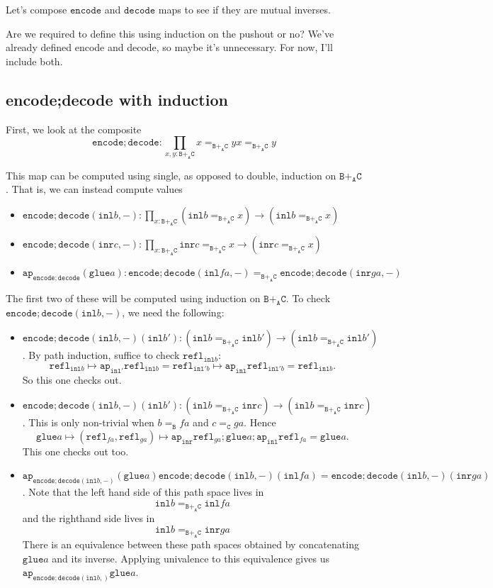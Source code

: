 \documentclass[12pt]{amsart}
\newcommand{\from}{\colon}
\newcommand{\edit}[1]{{\color{red} #1 }}
\newcommand{\type}[1]{\mathtt{#1}}
\newcommand{\tin}{\colon}
\newcommand{\A}{\type{A}}
\newcommand{\B}{\type{B}}
\newcommand{\C}{\type{C}}
\newcommand{\BAC}{\B +_{\A} \C}
\newcommand{\ap}{\type{ap}}
\newcommand{\inl}{\type{inl}}
\newcommand{\inr}{\type{inr}}
\newcommand{\glue}{\type{glue}}
\newcommand{\refl}{\type{refl}}
\newcommand{\encode}{\type{encode}}
\newcommand{\decode}{\type{decode}}
\theoremstyle{remark}
\theoremstyle{definition}
\begin{document}
Let's compose \( \encode \) and \( \decode \) maps to see if they are
mutual inverses.  

\edit{ Are we required to define this using induction on the pushout
  or no? We've already defined encode and decode, so maybe it's
  unnecessary. For now, I'll include both.}

\subsection{encode;decode with induction}

First, we look at the composite
\[
  \encode ; \decode
  \from
  \prod\limits_{x,y \tin \BAC} x =_{\BAC} y
  x =_{\BAC} y
\]

This map can be computed using single, as opposed to double, induction
on \( \BAC \). That is, we can instead compute values
\begin{itemize}
\item
  \( \encode ; \decode ( \inl b , - ) \from \prod\limits_{x \tin
  \BAC} ( \inl b =_{\BAC} x ) \to ( \inl b =_{\BAC} x ) \)
\item
  \( \encode ; \decode ( \inr c , - ) \from \prod\limits_{x \tin
  \BAC} \inr c =_{\BAC} x \to ( \inr c =_{\BAC} x ) \)
\item
  \( \ap_{\encode ; \decode} (\glue a ) \tin \encode ; \decode ( \inl
  fa , -  )
  =_{\BAC} \encode ; \decode (\inr ga , - ) \)
\end{itemize}

The first two of these will be computed using induction on \( \BAC
\). To check \( \encode ; \decode ( \inl b , - ) \), we need the
following:
\begin{itemize}
\item
  \( \encode ; \decode ( \inl b , - ) ( \inl b' ) \from ( \inl b
  =_{\BAC} \inl b' ) \to ( \inl b =_{\BAC} \inl b' )  \). By path
  induction, suffice to check \( \refl_{\inl b} \):
  \[
    \refl_{\inl b} \mapsto \ap_{\inl'} \refl_{\inl b}
    = \refl_{\inl' b} \mapsto \ap_{\inl} \refl_{\inl' b} =
    \refl_{\inl b}.
  \]
  So this one checks out.
\item
  \( \encode ; \decode ( \inl b , - ) ( \inl b' ) \from ( \inl b
  =_{\BAC} \inr c ) \to ( \inl b =_{\BAC} \inr c )  \). This is only
  non-trivial when \( b =_\B fa \) and \( c =_\C ga \). Hence
  \[
    \glue a \mapsto ( \refl_{fa} , \refl_{ga} ) \mapsto \ap_{\inr}
    \refl_{ga} ; \glue a ; \ap_{\inl} \refl_{fa} = \glue a.
  \]
  This one checks out too.
\item
  \( \ap_{\encode ; \decode ( \inl b, -)} (\glue a) \encode ; \decode
  (\inl b , -)(\inl fa) = \encode ; \decode (\inl b , -)(\inr ga)
  \). Note that the left hand side of this path space lives in
  \[
    \inl b =_{\BAC} \inl fa
  \]
  and the righthand side lives in
  \[
    \inl b =_{\BAC} \inr ga
  \]
  There is an equivalence between these path spaces obtained by
  concatenating \( \glue a \) and its inverse. Applying univalence to
  this equivalence gives us \( \ap_{\encode ; \decode (\inl b , )}
  \glue a \).
\end{itemize}
\end{document}
